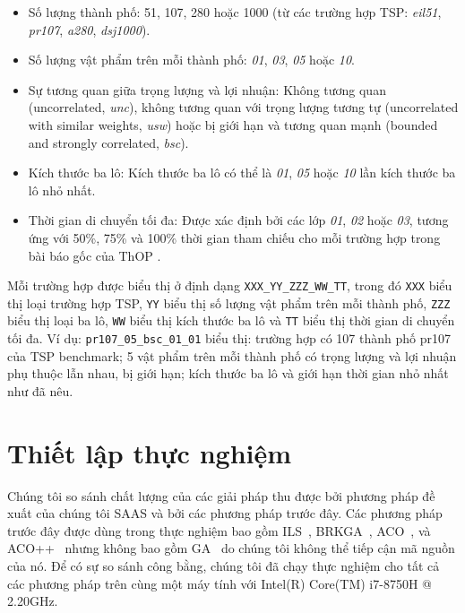 \begin{itemize}
    \item Số lượng thành phố: 51, 107, 280 hoặc 1000 (từ các trường hợp TSP: \textit{eil51}, \textit{pr107}, \textit{a280}, \textit{dsj1000}).
    \item Số lượng vật phẩm trên mỗi thành phố: \textit{01}, \textit{03}, \textit{05} hoặc \textit{10}.
    \item Sự tương quan giữa trọng lượng và lợi nhuận: Không tương quan (uncorrelated, \textit{unc}), không tương quan với trọng lượng tương tự (uncorrelated with similar weights, \textit{usw}) hoặc bị giới hạn và tương quan mạnh (bounded and strongly correlated, \textit{bsc}).
    \item Kích thước ba lô: Kích thước ba lô có thể là \textit{01}, \textit{05} hoặc \textit{10} lần kích thước ba lô nhỏ nhất.
    \item Thời gian di chuyển tối đa: Được xác định bởi các lớp \textit{01}, \textit{02} hoặc \textit{03}, tương ứng với 50\%, 75\% và 100\% thời gian tham chiếu cho mỗi trường hợp trong bài báo gốc của ThOP \cite{8477853}.
\end{itemize}

Mỗi trường hợp được biểu thị ở định dạng \texttt{XXX\_YY\_ZZZ\_WW\_TT}, trong đó \texttt{XXX} biểu thị loại trường hợp TSP, \texttt{YY} biểu thị số lượng vật phẩm trên mỗi thành phố, \texttt{ZZZ} biểu thị loại ba lô, \texttt{WW} biểu thị kích thước ba lô và \texttt{TT} biểu thị thời gian di chuyển tối đa. Ví dụ: \texttt{pr107\_05\_bsc\_01\_01} biểu thị: trường hợp có 107 thành phố pr107 của TSP benchmark; 5 vật phẩm trên mỗi thành phố có trọng lượng và lợi nhuận phụ thuộc lẫn nhau, bị giới hạn; kích thước ba lô và giới hạn thời gian nhỏ nhất như đã nêu.

\section{Thiết lập thực nghiệm} \label{sec:experimentsSetup}

Chúng tôi so sánh chất lượng của các giải pháp thu được bởi phương pháp đề xuất của chúng tôi SAAS và bởi các phương pháp trước đây. Các phương pháp trước đây được dùng trong thực nghiệm bao gồm ILS~\cite{8477853}, BRKGA~\cite{8477853}, ACO~\cite{CHAGAS2020708}, và ACO++~\cite{Chagas2021} nhưng không bao gồm GA~\cite{9185848} do chúng tôi không thể tiếp cận mã nguồn của nó. Để có sự so sánh công bằng, chúng tôi đã chạy thực nghiệm cho tất cả các phương pháp trên cùng một máy tính với Intel(R) Core(TM) i7-8750H @ 2.20GHz.

